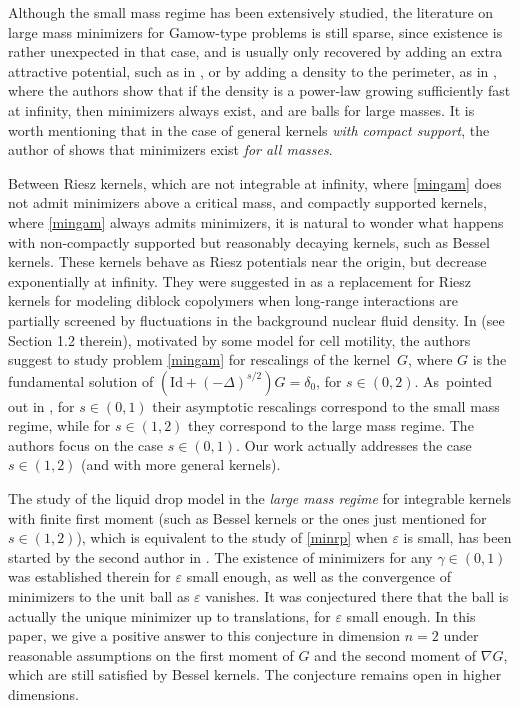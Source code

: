 \documentclass[JEP,XML,SOM,Unicode,published]{cedram}
\numberwithin{equation}{section}
\theoremstyle{plain}
\theoremstyle{definition}
\let\eps\varepsilon
\newcommand{\id}{{\mathrm{Id}}}
\newcommand{\grad}{\nabla}
\begin{document}
Although the small mass regime has been extensively studied, the literature on large mass
minimizers for Gamow-type problems is still sparse, since existence is rather unexpected in that
case, and is usually only recovered by adding an extra attractive potential, such as in
\cite{ABCT2017,ABCT2018,GO2018}, or by adding a density to the perimeter, as in
\cite{ABTZ2021}, where the authors show that if the density is a power-law growing sufficiently
fast at infinity, then minimizers always exist, and are balls for large masses.
It is worth mentioning that in the case of general kernels \emph{with compact support}, the
author of \cite{Rig2000} shows that minimizers exist \emph{for all masses}.

Between Riesz kernels, which are not integrable at infinity, where \cref{mingam} does not admit
minimizers above a critical mass, and compactly supported kernels, where \cref{mingam} always admits
minimizers, it is natural to wonder what happens with non-compactly supported but
reasonably decaying kernels, such as Bessel kernels. These kernels beha\-ve as Riesz potentials near
the origin, but decrease exponentially at infinity. They were suggested in \cite{KMN2016} as a
replacement for Riesz kernels for modeling diblock copolymers when long-range interactions are
partially screened by fluctuations in the background nuclear fluid density.
In \cite{MW2021} (see Section 1.2 therein), motivated by some model for cell motility, the
authors suggest to study problem \cref{mingam} for rescalings of the kernel~$G$, where $G$ is the
fundamental solution of $\left(\id +(-\Delta)^{s/2}\right)G=\delta_0$, for $s\in (0,2)$.
As~pointed out in \cite[Rem.\,1.3]{MW2021}, for $s\in(0,1)$ their asymptotic rescalings
correspond to the small mass regime, while for $s\in(1,2)$ they correspond to the large mass
regime. The authors focus on the case $s\in(0,1)$. Our work actually addresses the case
$s\in(1,2)$ (and with more general kernels).

The study of the liquid drop model in the \emph{large mass regime} for integrable kernels with
finite first moment (such as Bessel kernels or the ones just mentioned for $s\in(1,2)$), which is
equivalent to the study of \cref{minrp} when $\eps$ is small, has been started by the second author
in \cite{Peg2021}. The existence of minimizers for any $\gamma\in(0,1)$ was established therein
for $\eps$ small enough, as well as the convergence of minimizers to the unit ball as $\eps$
vanishes. It was conjectured there that the ball is actually the unique minimizer up to
translations, for $\eps$ small enough. In this paper, we give a positive answer to this
conjecture in dimension $n=2$ under reasonable assumptions on the first moment of $G$ and the
second moment of $\grad G$, which are still satisfied by Bessel kernels. The conjecture remains
open in higher dimensions.
\end{document}
